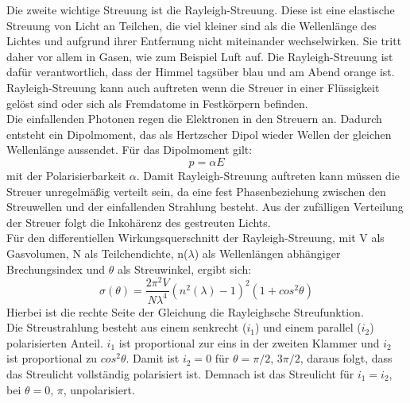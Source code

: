 \documentclass[.../bericht]{subfilies}
\begin{document}
      Die zweite wichtige Streuung ist die Rayleigh-Streuung. Diese ist eine elastische Streuung von Licht an Teilchen, die viel kleiner sind als die Wellenlänge des Lichtes und aufgrund ihrer Entfernung nicht miteinander wechselwirken. Sie tritt daher vor allem in Gasen, wie zum Beispiel Luft auf. Die Rayleigh-Streuung ist dafür verantwortlich, dass der Himmel tagsüber blau und am Abend orange ist. Rayleigh-Streuung kann auch auftreten wenn die Streuer in einer Flüssigkeit gelöst sind oder sich als Fremdatome in Festkörpern befinden. \\
      Die einfallenden Photonen regen die Elektronen in den Streuern an. Dadurch entsteht ein Dipolmoment, das als Hertzscher Dipol wieder Wellen der gleichen Wellenlänge aussendet. Für das Dipolmoment gilt:
      \begin{equation}
        p=\alpha E
        \label{eq:dipol}
      \end{equation}
      mit der Polarisierbarkeit $\alpha$. Damit Rayleigh-Streuung auftreten kann müssen die Streuer unregelmäßig verteilt sein, da eine fest Phasenbeziehung zwischen den Streuwellen und der einfallenden Strahlung besteht. Aus der zufälligen Verteilung der Streuer folgt die Inkohärenz des gestreuten Lichts. \\
      Für den differentiellen Wirkungsquerschnitt der Rayleigh-Streuung, mit V als Gasvolumen, N als Teilchendichte, n($\lambda$) als Wellenlängen abhängiger Brechungsindex und $\theta$ als Streuwinkel, ergibt sich:
      \begin{equation}
        \sigma(\theta)=\frac{2\pi^2 V}{N\lambda^4}(n^2(\lambda)-1)^2(1+cos^2\theta)
        \label{eq:streuquerschnitt}
      \end{equation}
      Hierbei ist die rechte Seite der Gleichung die Rayleighsche Streufunktion. \\

      Die Streustrahlung besteht aus einem senkrecht ($i_1$) und einem parallel ($i_2$) polarisierten Anteil. $i_1$ ist proportional zur eins in der zweiten Klammer und $i_2$ ist proportional zu $cos^2\theta$. Damit ist $i_2=0$ für $\theta=\pi/2$, $3\pi/2$, daraus folgt, dass das Streulicht vollständig polarisiert ist. Demnach ist das Streulicht für $i_1=i_2$, bei $\theta=0$, $\pi$, unpolarisiert.
\end{document}
